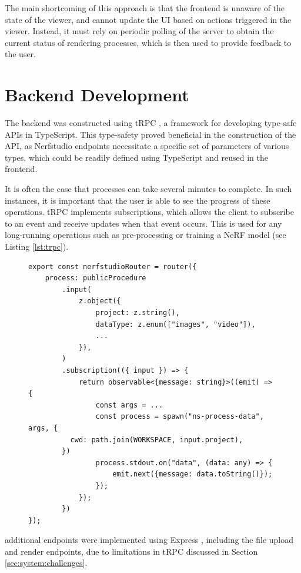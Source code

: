 The main shortcoming of this approach is that the frontend is unaware of the state of the viewer, and cannot update the UI based on actions triggered in the viewer.
Instead, it must rely on periodic polling of the server to obtain the current status of rendering processes, which is then used to provide feedback to the user.

\section{Backend Development}
\label{sec:system:backend}

The backend was constructed using tRPC \cite{noauthor_trpc_nodate}, a framework for developing type-safe APIs in TypeScript.
This type-safety proved beneficial in the construction of the API, as Nerfstudio endpoints necessitate a specific set of parameters of various types, which could be readily defined using TypeScript and reused in the frontend.

It is often the case that processes can take several minutes to complete.
In such instances, it is important that the user is able to see the progress of these operations.
tRPC implements subscriptions, which allows the client to subscribe to an event and receive updates when that event occurs.
This is used for any long-running operations such as pre-processing or training a NeRF model (see Listing \ref{lst:trpc}).


\begin{figure}[htb]
\begin{lstlisting}[style=ES6, caption=Example tRPC endpoint for Pre-Processing returning a subscription., label=lst:trpc]
export const nerfstudioRouter = router({
	process: publicProcedure
		.input(
			z.object({
				project: z.string(),
				dataType: z.enum(["images", "video"]),
				...
			}),
		)
		.subscription(({ input }) => {
			return observable<{message: string}>((emit) => {
				const args = ...
				const process = spawn("ns-process-data", args, {
          cwd: path.join(WORKSPACE, input.project),
        })
				process.stdout.on("data", (data: any) => {
					emit.next({message: data.toString()});
				});
			});
		})
});
\end{lstlisting}
\end{figure}

additional endpoints were implemented using Express \cite{noauthor_express_nodate}, including the file upload and render endpoints, due to limitations in tRPC discussed in Section \ref{sec:system:challenges}.

